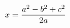 \documentclass[preview]{standalone}
\begin{document}
\begin{align*}
\special{dvisvgm:raw <g id='unique000'>}x = \frac{a^2 - b^2 + c^2}{2a}\special{dvisvgm:raw </g>}
\end{align*}
\end{document}

